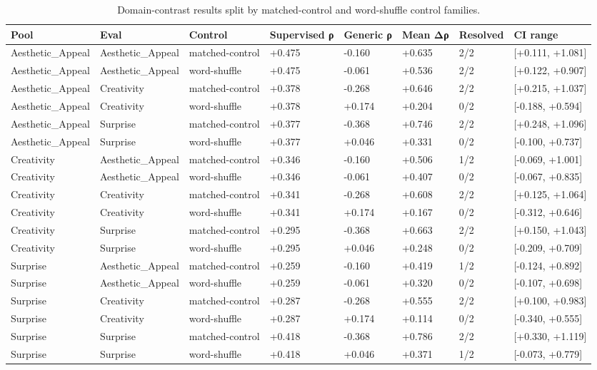\begin{table}
\caption{Domain-contrast results split by matched-control and word-shuffle control families.}
\label{tab:table_8_domain_contrast_by_control_family}
\begin{tabular}{llllllll}
\toprule
Pool & Eval & Control & Supervised ρ & Generic ρ & Mean Δρ & Resolved & CI range \\
\midrule
Aesthetic\_Appeal & Aesthetic\_Appeal & matched-control & +0.475 & -0.160 & +0.635 & 2/2 & [+0.111, +1.081] \\
Aesthetic\_Appeal & Aesthetic\_Appeal & word-shuffle & +0.475 & -0.061 & +0.536 & 2/2 & [+0.122, +0.907] \\
Aesthetic\_Appeal & Creativity & matched-control & +0.378 & -0.268 & +0.646 & 2/2 & [+0.215, +1.037] \\
Aesthetic\_Appeal & Creativity & word-shuffle & +0.378 & +0.174 & +0.204 & 0/2 & [-0.188, +0.594] \\
Aesthetic\_Appeal & Surprise & matched-control & +0.377 & -0.368 & +0.746 & 2/2 & [+0.248, +1.096] \\
Aesthetic\_Appeal & Surprise & word-shuffle & +0.377 & +0.046 & +0.331 & 0/2 & [-0.100, +0.737] \\
Creativity & Aesthetic\_Appeal & matched-control & +0.346 & -0.160 & +0.506 & 1/2 & [-0.069, +1.001] \\
Creativity & Aesthetic\_Appeal & word-shuffle & +0.346 & -0.061 & +0.407 & 0/2 & [-0.067, +0.835] \\
Creativity & Creativity & matched-control & +0.341 & -0.268 & +0.608 & 2/2 & [+0.125, +1.064] \\
Creativity & Creativity & word-shuffle & +0.341 & +0.174 & +0.167 & 0/2 & [-0.312, +0.646] \\
Creativity & Surprise & matched-control & +0.295 & -0.368 & +0.663 & 2/2 & [+0.150, +1.043] \\
Creativity & Surprise & word-shuffle & +0.295 & +0.046 & +0.248 & 0/2 & [-0.209, +0.709] \\
Surprise & Aesthetic\_Appeal & matched-control & +0.259 & -0.160 & +0.419 & 1/2 & [-0.124, +0.892] \\
Surprise & Aesthetic\_Appeal & word-shuffle & +0.259 & -0.061 & +0.320 & 0/2 & [-0.107, +0.698] \\
Surprise & Creativity & matched-control & +0.287 & -0.268 & +0.555 & 2/2 & [+0.100, +0.983] \\
Surprise & Creativity & word-shuffle & +0.287 & +0.174 & +0.114 & 0/2 & [-0.340, +0.555] \\
Surprise & Surprise & matched-control & +0.418 & -0.368 & +0.786 & 2/2 & [+0.330, +1.119] \\
Surprise & Surprise & word-shuffle & +0.418 & +0.046 & +0.371 & 1/2 & [-0.073, +0.779] \\
\bottomrule
\end{tabular}
\end{table}
